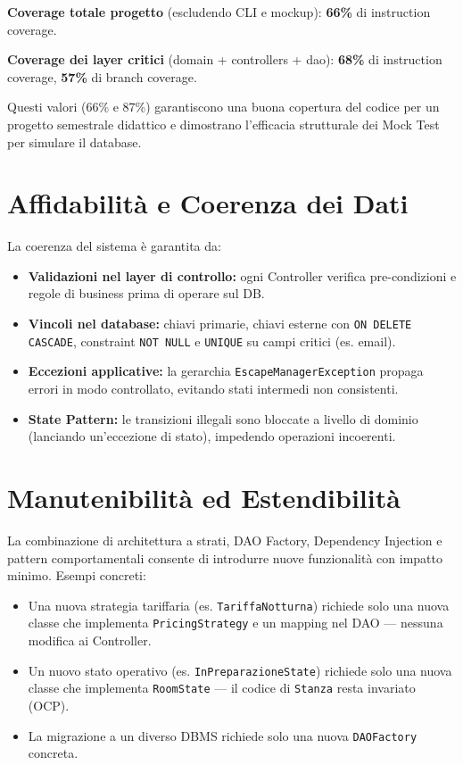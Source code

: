 \textbf{Coverage totale progetto} (escludendo CLI e mockup): \textbf{66\%} di instruction coverage.

\textbf{Coverage dei layer critici} (domain + controllers + dao): \textbf{68\%} di instruction coverage, \textbf{57\%} di branch coverage.

Questi valori (66\% e 87\%) garantiscono una buona copertura del codice per un progetto semestrale didattico e dimostrano l'efficacia strutturale dei Mock Test per simulare il database.

\section{Affidabilità e Coerenza dei Dati}
La coerenza del sistema è garantita da:
\begin{itemize}
    \item \textbf{Validazioni nel layer di controllo:} ogni Controller verifica pre-condizioni e regole di business prima di operare sul DB.
    \item \textbf{Vincoli nel database:} chiavi primarie, chiavi esterne con \texttt{ON DELETE CASCADE}, constraint \texttt{NOT NULL} e \texttt{UNIQUE} su campi critici (es. email).
    \item \textbf{Eccezioni applicative:} la gerarchia \texttt{EscapeManagerException} propaga errori in modo controllato, evitando stati intermedi non consistenti.
    \item \textbf{State Pattern:} le transizioni illegali sono bloccate a livello di dominio (lanciando un'eccezione di stato), impedendo operazioni incoerenti.
\end{itemize}

\section{Manutenibilità ed Estendibilità}
La combinazione di architettura a strati, DAO Factory, Dependency Injection e pattern comportamentali consente di introdurre nuove funzionalità con impatto minimo. Esempi concreti:
\begin{itemize}
    \item Una nuova strategia tariffaria (es. \texttt{TariffaNotturna}) richiede solo una nuova classe che implementa \texttt{PricingStrategy} e un mapping nel DAO --- nessuna modifica ai Controller.
    \item Un nuovo stato operativo (es. \texttt{InPreparazioneState}) richiede solo una nuova classe che implementa \texttt{RoomState} --- il codice di \texttt{Stanza} resta invariato (OCP).
    \item La migrazione a un diverso DBMS richiede solo una nuova \texttt{DAOFactory} concreta.
\end{itemize}

